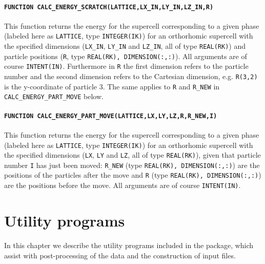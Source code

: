 \documentclass{report}
\begin{document}
\subsubsection{\texttt{FUNCTION CALC\_ENERGY\_SCRATCH(LATTICE,LX\_IN,LY\_IN,LZ\_IN,R)}}
This function returns the energy for the supercell corresponding to a given phase (labeled here as \verb|LATTICE|, type \verb|INTEGER(IK)|) for 
an orthorhomic supercell with the specified dimensions (\verb|LX_IN|, \verb|LY_IN| and \verb|LZ_IN|, all of type \verb|REAL(RK)|) and particle 
positions (\verb|R|, type \verb|REAL(RK), DIMENSION(:,:)|). All arguments are of course \verb|INTENT(IN)|. Furthermore in \verb|R| the first dimension
refers to the particle number and the second dimension refers to the Cartesian dimension, e.g. \verb|R(3,2)| is the y-coordinate of particle 3.
The same applies to \verb|R| and \verb|R_NEW| in \verb|CALC_ENERGY_PART_MOVE| below. 

\subsubsection{\texttt{FUNCTION CALC\_ENERGY\_PART\_MOVE(LATTICE,LX,LY,LZ,R,R\_NEW,I)}}
This function returns the energy for the supercell corresponding to a given phase (labeled here as \verb|LATTICE|, type \verb|INTEGER(IK)|) for 
an orthorhomic supercell with the specified dimensions (\verb|LX|, \verb|LY| and \verb|LZ|, all of type \verb|REAL(RK)|), given that particle
number \verb|I| has just been moved: \verb|R_NEW| (type \verb|REAL(RK), DIMENSION(:,:)|) are the positions of the particles after the move
and \verb|R| (type \verb|REAL(RK), DIMENSION(:,:)|) are the positions before the move. All arguments are of course \verb|INTENT(IN)|. 




\chapter{Utility programs}\label{chapter:utility_programs}
In this chapter we describe the utility programs included in the package, which assist with post-processing of the data and the construction
of input files.
\end{document}

